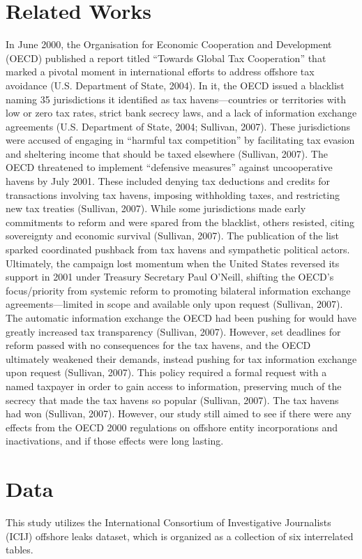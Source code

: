 \documentclass{article}
\begin{document}
\section{Related Works}
In June 2000, the Organisation for Economic Cooperation and Development (OECD) published a report titled “Towards Global Tax Cooperation” that marked a pivotal moment in international efforts to address offshore tax avoidance (U.S. Department of State, 2004). In it, the OECD issued a blacklist naming 35 jurisdictions it identified as tax havens—countries or territories with low or zero tax rates, strict bank secrecy laws, and a lack of information exchange agreements (U.S. Department of State, 2004; Sullivan, 2007). These jurisdictions were accused of engaging in “harmful tax competition” by facilitating tax evasion and sheltering income that should be taxed elsewhere (Sullivan, 2007). The OECD threatened to implement “defensive measures” against uncooperative havens by July 2001. These included denying tax deductions and credits for transactions involving tax havens, imposing withholding taxes, and restricting new tax treaties (Sullivan, 2007). While some jurisdictions made early commitments to reform and were spared from the blacklist, others resisted, citing sovereignty and economic survival (Sullivan, 2007). The publication of the list sparked coordinated pushback from tax havens and sympathetic political actors. Ultimately, the campaign lost momentum when the United States reversed its support in 2001 under Treasury Secretary Paul O’Neill, shifting the OECD’s focus/priority from systemic reform to promoting bilateral information exchange agreements—limited in scope and available only upon request (Sullivan, 2007). The automatic information exchange the OECD had been pushing for would have greatly increased tax transparency (Sullivan, 2007). However, set deadlines for reform passed with no consequences for the tax havens, and the OECD ultimately weakened their demands, instead pushing for tax information exchange upon request (Sullivan, 2007). This policy required a formal request with a named taxpayer in order to gain access to information, preserving much of the secrecy that made the tax havens so popular (Sullivan, 2007). The tax havens had won (Sullivan, 2007). However, our study still aimed to see if there were any effects from the OECD 2000 regulations on offshore entity incorporations and inactivations, and if those effects were long lasting.

\section{Data}
This study utilizes the International Consortium of Investigative Journalists (ICIJ) offshore leaks dataset, which is organized as a collection of six interrelated tables. 
\end{document}
